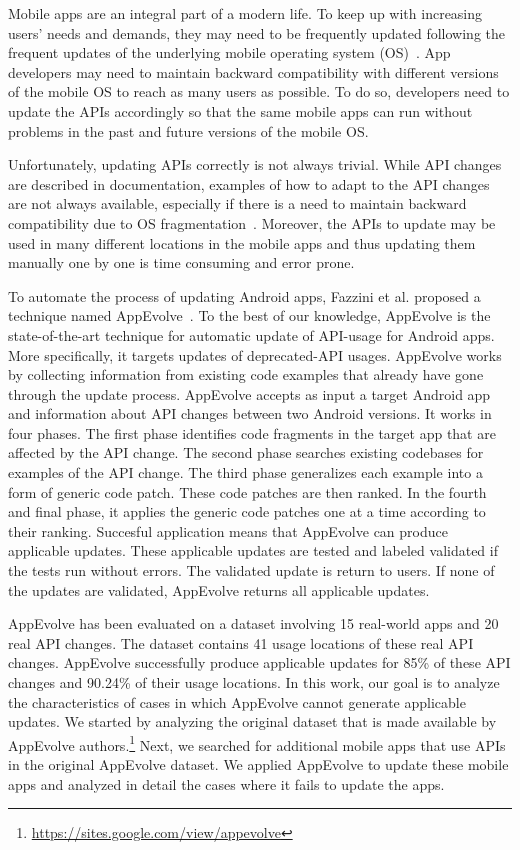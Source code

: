 Mobile apps are an integral part of a modern life. To keep up with increasing users' needs and demands, they may need to be frequently updated following the frequent updates of the underlying mobile operating system (OS)~\cite{bavota2014impact,han2012understanding,linares2013api,mcdonnell2013empirical,yang2018android}. App developers may need to maintain backward compatibility with different versions of the mobile OS to reach as many users as possible. To do so, developers need to update the APIs accordingly so that the same mobile apps can run without problems in the past and future versions of the mobile OS.

Unfortunately, updating APIs correctly is not always trivial. While API changes are described in documentation, examples of how to adapt to the API changes are not always available, especially if there is a need to maintain backward compatibility due to OS fragmentation~\cite{he2018understanding,li2018cid}. Moreover, the APIs to update may be used in many different locations in the mobile apps and thus updating them manually one by one is time consuming and error prone.

To automate the process of updating Android apps, Fazzini et al. proposed a technique named AppEvolve~\cite{fazzini2019automated}. To the best of our knowledge, AppEvolve is the state-of-the-art technique for automatic update of API-usage for Android apps. More specifically, it targets updates of deprecated-API usages. AppEvolve works by collecting information from existing code examples that already have gone through the update process. AppEvolve accepts as input a target Android app and information about API changes between two Android versions. It works in four phases. The first phase identifies code fragments in the target app that are affected by the API change. The second phase searches existing codebases for examples of the API change. The third phase generalizes each example into a form of generic code patch. These code patches are then ranked. In the fourth and final phase, it applies the generic code patches one at a time according to their ranking. Succesful application means that AppEvolve can produce applicable updates. These applicable updates are tested and labeled validated if the tests run without errors. The validated update is return to users. If none of the updates are validated, AppEvolve returns all applicable updates.

AppEvolve has been evaluated on a dataset involving 15 real-world apps and 20 real API changes. The dataset contains 41 usage locations of these real API changes. AppEvolve successfully produce applicable updates for 85\% of these API changes and 90.24\% of their usage locations. In this work, our goal is to analyze the characteristics of cases in which AppEvolve cannot generate applicable updates. We started by analyzing the original dataset that is made available by AppEvolve authors.\footnote{\url{https://sites.google.com/view/appevolve}} Next, we searched for additional mobile apps that use APIs in the original AppEvolve dataset. We applied AppEvolve to update these mobile apps and analyzed in detail the cases where it fails to update the apps.

